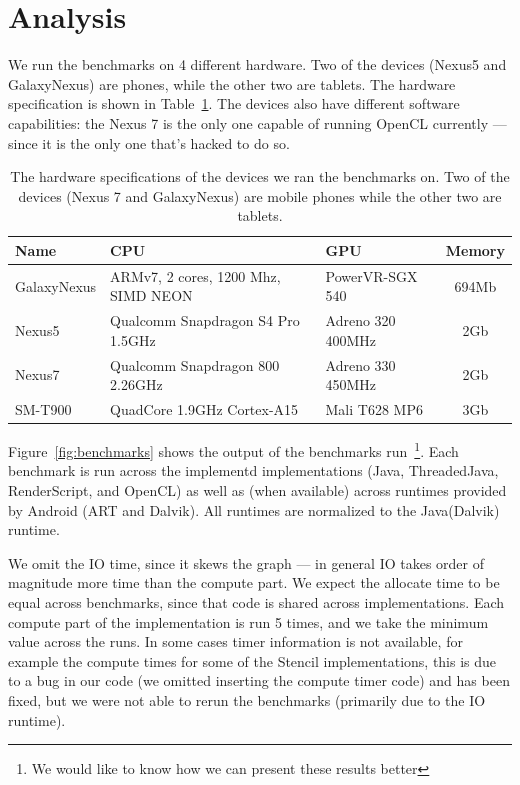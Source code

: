 \section*{Analysis}
\label{sec:analysis}

We run the benchmarks on 4 different hardware.
Two of the devices (Nexus5 and GalaxyNexus) are phones, while the other two are tablets.
The hardware specification is shown in Table~\ref{table:hardware}.
The devices also have different software capabilities: the Nexus 7
  is the only one capable of running OpenCL currently --- since it is the only
  one that's hacked to do so.

\begin{table}[h]\small
\centering
\begin{tabular}{ | l | p{2.5cm} | p{1.75cm} | c |}
    \hline 
    Name & CPU & GPU & Memory \\ \hline
    GalaxyNexus & ARMv7, 2 cores, 1200 Mhz, SIMD NEON & PowerVR-SGX 540 & 694Mb \\ \hline
    Nexus5 & Qualcomm Snapdragon S4 Pro 1.5GHz & Adreno 320 400MHz & 2Gb \\ \hline
    Nexus7 & Qualcomm Snapdragon 800 2.26GHz & Adreno 330 450MHz & 2Gb \\ \hline
    SM-T900 & QuadCore 1.9GHz Cortex-A15 & Mali T628 MP6 & 3Gb \\ \hline
    \hline
\end{tabular}
\caption{The hardware specifications of the devices we ran the benchmarks on. Two of the devices (Nexus 7 and GalaxyNexus) are mobile phones while the other two are tablets.}
\label{table:hardware}
\end{table}

Figure~\ref{fig:benchmarks} shows the output of the benchmarks run~\footnote{We would like to know how we can present these results better}.
Each benchmark is run across the implementd implementations (Java, ThreadedJava, RenderScript, and OpenCL) as well as (when available) across runtimes provided by Android (ART and Dalvik).
All runtimes are normalized to the Java(Dalvik) runtime.

We omit the IO time, since it skews the graph --- in general IO takes 
  order of magnitude more time than the compute part.
We expect the allocate time to be equal across benchmarks, since
  that code is shared across implementations.
Each compute part of the implementation is run 5 times, and we 
  take the minimum value across the runs.
In some cases timer information is not available, for example the compute times for some of the Stencil implementations, this is due to a bug in our code (we omitted inserting the compute timer code) and has been fixed, but we were not able to rerun the benchmarks (primarily due to the IO runtime).

